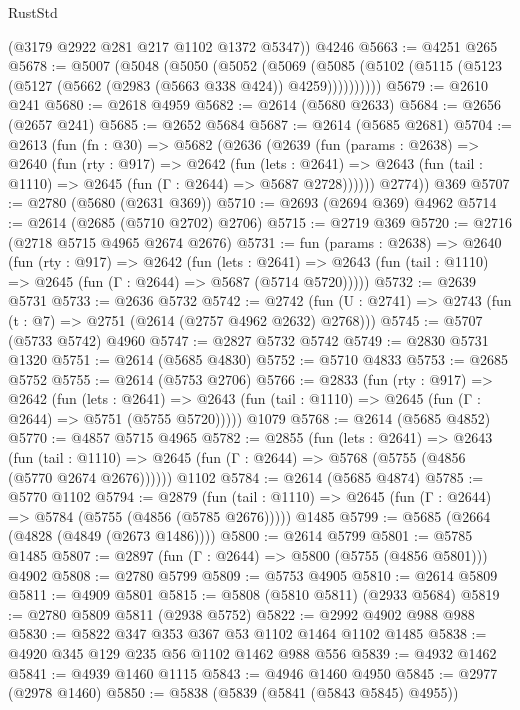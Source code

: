\begin{lexlean}{RustStd}
\begin{coremodule}
      (@3179 @2922 @281 @217 @1102 @1372 @5347))
    @4246
@5663 := @4251 @265
@5678 := @5007
    (@5048
      (@5050
        (@5052
          (@5069 (@5085 (@5102 (@5115 (@5123 (@5127 (@5662 (@2983 (@5663 @338 @424)) @4259))))))))))
@5679 := @2610 @241
@5680 := @2618 @4959
@5682 := @2614 (@5680 @2633)
@5684 := @2656 (@2657 @241)
@5685 := @2652 @5684
@5687 := @2614 (@5685 @2681)
@5704 := @2613
    (fun (fn : @30) =>
    @5682
      (@2636
        (@2639
          (fun (params : @2638) =>
          @2640
            (fun (rty : @917) =>
            @2642
              (fun (lets : @2641) =>
              @2643 (fun (tail : @1110) => @2645 (fun (Γ : @2644) => @5687 @2728))))))
        @2774))
    @369
@5707 := @2780 (@5680 (@2631 @369))
@5710 := @2693 (@2694 @369) @4962
@5714 := @2614 (@2685 (@5710 @2702) @2706)
@5715 := @2719 @369
@5720 := @2716 (@2718 @5715 @4965 @2674 @2676)
@5731 := fun (params : @2638) =>
  @2640
    (fun (rty : @917) =>
    @2642
      (fun (lets : @2641) =>
      @2643 (fun (tail : @1110) => @2645 (fun (Γ : @2644) => @5687 (@5714 @5720)))))
@5732 := @2639 @5731
@5733 := @2636 @5732
@5742 := @2742 (fun (U : @2741) => @2743 (fun (t : @7) => @2751 (@2614 (@2757 @4962 @2632) @2768)))
@5745 := @5707 (@5733 @5742) @4960
@5747 := @2827 @5732 @5742
@5749 := @2830 @5731 @1320
@5751 := @2614 (@5685 @4830)
@5752 := @5710 @4833
@5753 := @2685 @5752
@5755 := @2614 (@5753 @2706)
@5766 := @2833
    (fun (rty : @917) =>
    @2642
      (fun (lets : @2641) =>
      @2643 (fun (tail : @1110) => @2645 (fun (Γ : @2644) => @5751 (@5755 @5720)))))
    @1079
@5768 := @2614 (@5685 @4852)
@5770 := @4857 @5715 @4965
@5782 := @2855
    (fun (lets : @2641) =>
    @2643
      (fun (tail : @1110) => @2645 (fun (Γ : @2644) => @5768 (@5755 (@4856 (@5770 @2674 @2676))))))
    @1102
@5784 := @2614 (@5685 @4874)
@5785 := @5770 @1102
@5794 := @2879
    (fun (tail : @1110) => @2645 (fun (Γ : @2644) => @5784 (@5755 (@4856 (@5785 @2676)))))
    @1485
@5799 := @5685 (@2664 (@4828 (@4849 (@2673 @1486))))
@5800 := @2614 @5799
@5801 := @5785 @1485
@5807 := @2897 (fun (Γ : @2644) => @5800 (@5755 (@4856 @5801))) @4902
@5808 := @2780 @5799
@5809 := @5753 @4905
@5810 := @2614 @5809
@5811 := @4909 @5801
@5815 := @5808 (@5810 @5811) (@2933 @5684)
@5819 := @2780 @5809 @5811 (@2938 @5752)
@5822 := @2992 @4902 @988 @988
@5830 := @5822 @347 @353 @367 @53 @1102 @1464 @1102 @1485
@5838 := @4920 @345 @129 @235 @56 @1102 @1462 @988 @556
@5839 := @4932 @1462
@5841 := @4939 @1460 @1115
@5843 := @4946 @1460 @4950
@5845 := @2977 (@2978 @1460)
@5850 := @5838 (@5839 (@5841 (@5843 @5845) @4955))

\end{coremodule}
\end{lexlean}
